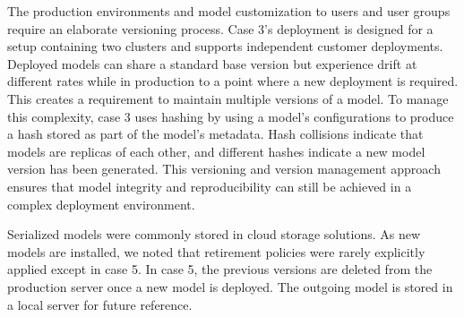 The \DIFdelbegin {}\DIFdelend \DIFaddbegin {}\DIFaddend production environments and model customization to \DIFaddbegin {}\DIFaddend users and user groups require an elaborate versioning process. Case 3's deployment is designed for a setup containing two clusters and supports independent customer deployments. Deployed models can share a standard base version \DIFdelbegin \DIFdel{, }\DIFdelend but experience drift at different rates while in production to a point where a new deployment is required. This creates a requirement to maintain multiple versions of a model. To manage this complexity, case 3 uses hashing by using a model's configurations to produce a hash stored as part of the model's metadata. Hash collisions indicate that models are replicas of each other, and different hashes indicate a new model version has been generated. This versioning and version management approach ensures that model integrity and reproducibility can still be achieved in a complex deployment environment.

Serialized models were commonly stored in cloud storage solutions. As new models are installed, we noted that retirement policies were rarely explicitly applied except in case 5. In case 5, the previous versions are deleted from the production server once a new model is deployed. The outgoing model is stored in a local server for future reference.






